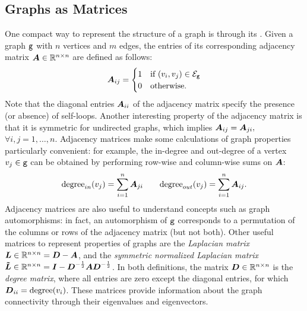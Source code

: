 \subsection{Graphs as Matrices} \label{sec:adj-matrix}
One compact way to represent the structure of a graph is through its  . Given a graph $\mathtt{g}$ with $n$ vertices and $m$ edges, the entries of its corresponding  adjacency matrix $\Matrix{A} \in \Real^{n \times n}$ are defined as follows:
\[
\Matrix{A}_{ij} =
    \begin{cases}
        1  & \text{if } (v_i, v_j) \in \Edges_{\Graph{g}}\\
        0  & \text{otherwise.}
    \end{cases}
\]
Note that the diagonal entries $\Matrix{A}_{ii}$ of the adjacency matrix specify the presence  (or absence) of self-loops. Another interesting property of the adjacency matrix is that  it is symmetric for undirected graphs, which implies $\Matrix{A}_{ij} = \Matrix{A}_{ji},$ $\forall i, j = 1, \ldots, n$. Adjacency matrices make some calculations of graph properties particularly convenient: for example, the in-degree and out-degree of a vertex $v_j \in \mathtt{g}$
can be obtained by performing row-wise and column-wise sums on $\Matrix{A}$:
$$
\Fun{degree}_{in}(v_j) = \sum_{i=1}^n \Matrix{A}_{ji} \quad \quad \Fun{degree}_{out}(v_j) = \sum_{i=1}^n \Matrix{A}_{ij}.
$$
Adjacency matrices are also useful to understand concepts such as graph automorphisms: in fact, an automorphism of $\mathtt{g}$ corresponds to a permutation of the columns or rows of the adjacency matrix (but not both). Other useful matrices to represent properties of graphs are the \emph{Laplacian matrix} $\Matrix{L} \in \Real^{n \times n} = \Matrix{D} - \Matrix{A}$, and the \emph{symmetric normalized Laplacian matrix} $\Matrix{\tilde{L}} \in \Real^{n \times n} = \Matrix{I} - \Matrix{D}^{-\frac{1}{2}}\Matrix{A}\Matrix{D}^{-\frac{1}{2}}$. In both definitions, the matrix  $\Matrix{D} \in \Real^{n \times n}$ is the \emph{degree matrix}, where all entries are zero except the diagonal entries, for which $\Matrix{D}_{ii} = \Fun{degree}(v_i)$. These matrices provide information about the graph connectivity through their eigenvalues and eigenvectors.

